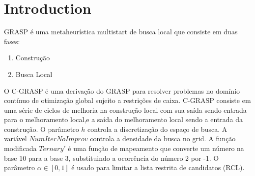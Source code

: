 \section{Introduction}
\begin{flushleft}


GRASP é uma metaheurística multistart de busca local que consiste em duas fases:
\begin{enumerate}
\item {Construção}
\item {Busca Local}
\end{enumerate}
O C-GRASP é uma derivação do GRASP para resolver problemas no domínio contínuo de otimização global sujeito a restrições de caixa.
C-GRASP consiste em uma série de ciclos de melhoria na construção local com sua saída sendo entrada para o melhoramento local,e a saída do melhoramento local sendo a entrada da construção.
O parâmetro $h$ controla a discretização do espaço de busca.
A variável $NumIterNoImprov$ controla a densidade da busca no grid.
A função modificada $Ternary'$ é uma função de mapeamento que converte um número na base 10 para a base 3, substituindo a ocorrência do número 2 por -1.
O parâmetro $\alpha \in [0,1]$ é usado para limitar a lista restrita de candidatos (RCL).\\


\end{flushleft}